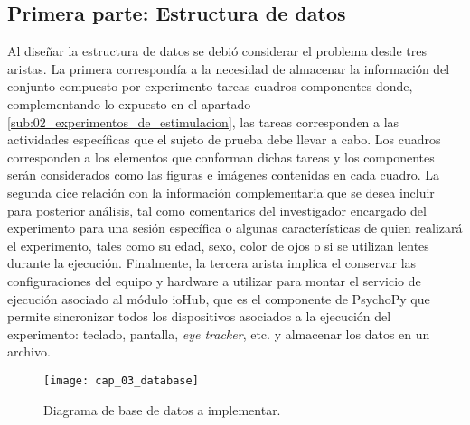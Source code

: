 \documentclass[\main/main.tex]{subfiles}
\begin{document}
	\subsection{Primera parte: Estructura de datos}
	\label{sub:03_estructura_datos}
		Al diseñar la estructura de datos se debió considerar el problema desde tres aristas. La primera correspondía a la necesidad de almacenar la información del conjunto compuesto por experimento-tareas-cuadros-componentes donde, complementando lo expuesto en el apartado \ref{sub:02_experimentos_de_estimulacion}, las tareas corresponden a las actividades específicas que el sujeto de prueba debe llevar a cabo. Los cuadros corresponden a los elementos que conforman dichas tareas y los componentes serán considerados como las figuras e imágenes contenidas en cada cuadro. La segunda dice relación con la información complementaria que se desea incluir para posterior análisis, tal como comentarios del investigador encargado del experimento para una sesión específica o algunas características de quien realizará el experimento, tales como su edad, sexo, color de ojos o si se utilizan lentes durante la ejecución. Finalmente, la tercera arista implica el conservar las configuraciones del equipo y hardware a utilizar para montar el servicio de ejecución asociado al módulo ioHub, que es el componente de PsychoPy que permite sincronizar todos los dispositivos asociados a la ejecución del experimento: teclado, pantalla, \textit{eye tracker}, etc. y almacenar los datos en un archivo. 
		\begin{figure}[H]
			\centering
			\texttt{[image: cap\_03\_database]}
			\caption{Diagrama de base de datos a implementar.}
			\label{fig:03_database}
		\end{figure} 
\end{document}
